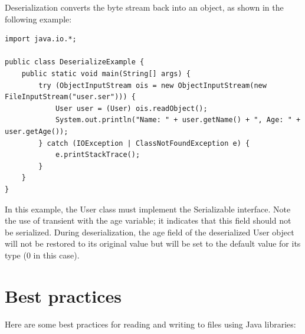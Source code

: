 Deserialization converts the byte stream back into an object, as shown in the following example:

\begin{lstlisting}
import java.io.*;

public class DeserializeExample {
    public static void main(String[] args) {
        try (ObjectInputStream ois = new ObjectInputStream(new FileInputStream("user.ser"))) {
            User user = (User) ois.readObject();
            System.out.println("Name: " + user.getName() + ", Age: " + user.getAge());
        } catch (IOException | ClassNotFoundException e) {
            e.printStackTrace();
        }
    }
}
\end{lstlisting}

In this example, the User class must implement the Serializable interface. Note the use of transient with the age variable; it indicates that this field should not be serialized. During deserialization, the age field of the deserialized User object will not be restored to its original value but will be set to the default value for its type (0 in this case).




\section{Best practices}

Here are some best practices for reading and writing to files using Java libraries:

